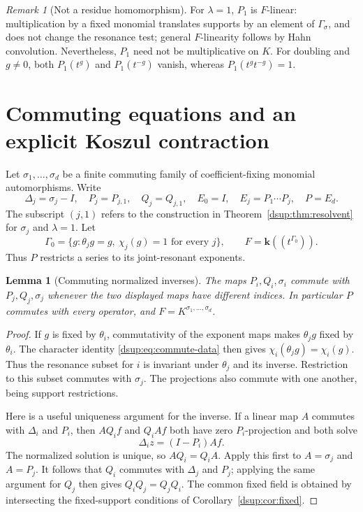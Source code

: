 \documentclass[11pt,oneside]{article}
\numberwithin{equation}{section}
\newtheorem{lemma}[theorem]{Lemma}
\theoremstyle{definition}
\theoremstyle{remark}
\newtheorem{remark}[theorem]{Remark}
\newcommand{\kk}{\mathbf k}
\begin{document}
\begin{remark}[Not a residue homomorphism]
For $\lambda=1$, $P_1$ is $F$-linear: multiplication by a fixed monomial
translates supports by an element of $\Gamma_\sigma$, and does not change
the resonance test; general $F$-linearity follows by Hahn convolution.
Nevertheless, $P_1$ need not be multiplicative on $K$. For doubling and
$g\ne0$, both $P_1(t^g)$ and $P_1(t^{-g})$ vanish, whereas
$P_1(t^gt^{-g})=1$.
\end{remark}

\section{Commuting equations and an explicit Koszul contraction}\label{dsup:sec:koszul}

Let $\sigma_1,\ldots,\sigma_d$ be a finite commuting family of
coefficient-fixing monomial automorphisms. Write
\[
 \Delta_j=\sigma_j-I,\quad P_j=P_{j,1},\quad Q_j=Q_{j,1},\quad
 E_0=I,\quad E_j=P_1\cdots P_j,\quad P=E_d.
\]
The subscript $(j,1)$ refers to the construction in
Theorem~\ref{dsup:thm:resolvent} for $\sigma_j$ and $\lambda=1$. Let
\begin{equation}\label{dsup:eq:jointgroup}
 \Gamma_0=\{g:\theta_jg=g,\ \chi_j(g)=1\text{ for every }j\},
 \qquad F=\kk((t^{\Gamma_0})).
\end{equation}
Thus $P$ restricts a series to its joint-resonant exponents.

\begin{lemma}[Commuting normalized inverses]\label{dsup:lem:operatorscommute}
The maps $P_i,Q_i,\sigma_i$ commute with $P_j,Q_j,\sigma_j$ whenever the
two displayed maps have different indices. In particular $P$ commutes
with every operator, and $F=K^{\sigma_1,\ldots,\sigma_d}$.
\end{lemma}
\begin{proof}
If $g$ is fixed by $\theta_i$, commutativity of the exponent maps makes
$\theta_jg$ fixed by $\theta_i$. The character identity
\eqref{dsup:eq:commute-data} then gives
$\chi_i(\theta_jg)=\chi_i(g)$. Thus the resonance subset for $i$ is
invariant under $\theta_j$ and its inverse. Restriction to this subset
commutes with $\sigma_j$. The projections also commute with one another,
being support restrictions.

Here is a useful uniqueness argument for the inverse. If a linear map
$A$ commutes with $\Delta_i$ and $P_i$, then $AQ_i f$ and $Q_iAf$ both
have zero $P_i$-projection and both solve
\[
 \Delta_i z=(I-P_i)Af.
\]
The normalized solution is unique, so $AQ_i=Q_iA$. Apply this first to
$A=\sigma_j$ and $A=P_j$. It follows that $Q_i$ commutes with $\Delta_j$
and $P_j$; applying the same argument for $Q_j$ then gives $Q_iQ_j=Q_jQ_i$.
The common fixed field is obtained by intersecting the fixed-support
conditions of Corollary~\ref{dsup:cor:fixed}.
\end{proof}
\end{document}
